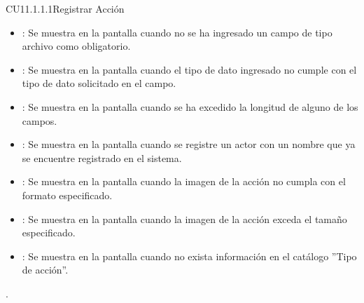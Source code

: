 \begin{UseCase}{CU11.1.1.1}{Registrar Acción}
{\begin{itemize}
			\item {}: Se muestra en la pantalla  cuando no se ha ingresado un campo de tipo archivo como obligatorio.
			\item {}: Se muestra en la pantalla  cuando el tipo de dato ingresado no cumple con el tipo de dato solicitado en el campo.
			\item {}: Se muestra en la pantalla  cuando se ha excedido la longitud de alguno de los campos.
			\item {}: Se muestra en la pantalla  cuando se registre un actor con un nombre que ya se encuentre registrado en el sistema.
			\item {}: Se muestra en la pantalla  cuando la imagen de la acción no cumpla con el formato especificado.
			\item {}: Se muestra en la pantalla  cuando la imagen de la acción exceda el tamaño especificado.
			\item {}: Se muestra en la pantalla  cuando no exista información en el catálogo ''Tipo de acción''.
			
		\end{itemize}.
	}
\end{UseCase}
